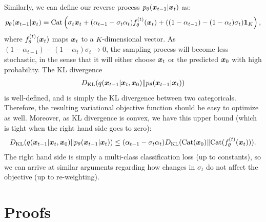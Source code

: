 Similarly, we can define our reverse process $p_\theta({\bm{x}}_{t-1} | {\bm{x}}_t)$ as:
\begin{align}
    p_\theta({\bm{x}}_{t-1} | {\bm{x}}_t) = \mathrm{Cat}\left(\sigma_t {\bm{x}}_t + (\alpha_{t-1} - \sigma_t \alpha_t) f_\theta^{(t)}({\bm{x}}_t) + ((1 - \alpha_{t-1}) - (1 - \alpha_t) \sigma_t) {\bm{1}}_K\right),
\end{align}
where $f_\theta^{(t)}({\bm{x}}_t)$ maps ${\bm{x}}_t$ to a $K$-dimensional vector. As $(1 - \alpha_{t-1}) - (1 - \alpha_t) \sigma_t \to 0$, the sampling process will become less stochastic, in the sense that it will either choose ${\bm{x}}_t$ or the predicted ${\bm{x}}_0$ with high probability.
The KL divergence
\begin{align}
    D_{\mathrm{KL}}(q({\bm{x}}_{t-1} | {\bm{x}}_t, {\bm{x}}_0) \Vert p_\theta({\bm{x}}_{t-1} | {\bm{x}}_t))
\end{align}
is well-defined, and is simply the KL divergence between two categoricals. Therefore, the resulting variational objective function should be easy to optimize as well. Moreover, as KL divergence is convex, we have this upper bound (which is tight when the right hand side goes to zero):
\begin{align}
    D_{\mathrm{KL}}(q({\bm{x}}_{t-1} | {\bm{x}}_t, {\bm{x}}_0) \Vert p_\theta({\bm{x}}_{t-1} | {\bm{x}}_t)) \leq (\alpha_{t-1} - \sigma_t \alpha_t) D_{\mathrm{KL}}(\mathrm{Cat}({\bm{x}}_0) \Vert \mathrm{Cat}(f_\theta^{(t)}({\bm{x}}_t))). \nonumber
\end{align}
The right hand side is simply a multi-class classification loss (up to constants), so we can arrive at similar arguments regarding how changes in $\sigma_t$ do not affect the objective (up to re-weighting).

\section{Proofs}
\label{app:proofs}

